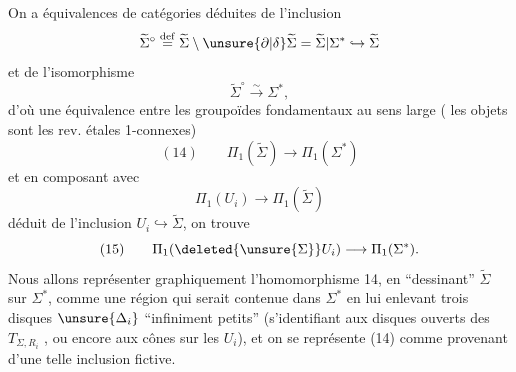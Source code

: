 On a  équivalences de catégories
déduites de l'inclusion
\[
\widetilde\Sigma^\circ \overset{\mathrm{def}}= \widetilde\Sigma\setminus\unsure{\partial|\delta}\widetilde\Sigma = \widetilde\Sigma|\Sigma^* \hookrightarrow \widetilde\Sigma
\]
et de l'isomorphisme
\[
\widetilde\Sigma^\circ \xrightarrow{\sim} \Sigma^*,
\]
d'où une équivalence entre les groupoïdes fondamentaux au sens large ( les objets sont les rev. étales 1-connexes)
\[
(14)\qquad \Pi_1(\widetilde\Sigma) \longrightarrow \Pi_1(\Sigma^*)
\]
et en composant avec
\[
\Pi_1(U_i)\longrightarrow \Pi_1(\widetilde\Sigma)
\]
déduit de l'inclusion $U_i\hookrightarrow\widetilde\Sigma$, on trouve
\[
(15)\qquad \Pi_1(\deleted{\unsure{\Sigma}}U_i)\longrightarrow\Pi_1(\Sigma^*).
\]
Nous allons représenter graphiquement l'homomorphisme 14, en ``dessinant'' $\widetilde\Sigma$ sur $\Sigma^*$, comme une région qui serait contenue dans $\Sigma^*$ en lui enlevant  trois disques  $\unsure{\Delta_i}$ ``infiniment petits''  (s'identifiant aux disques ouverts des $T_{\Sigma,R_i}$ , ou encore aux cônes sur les $U_i$), et on se représente (14) comme provenant d'une telle inclusion fictive.
